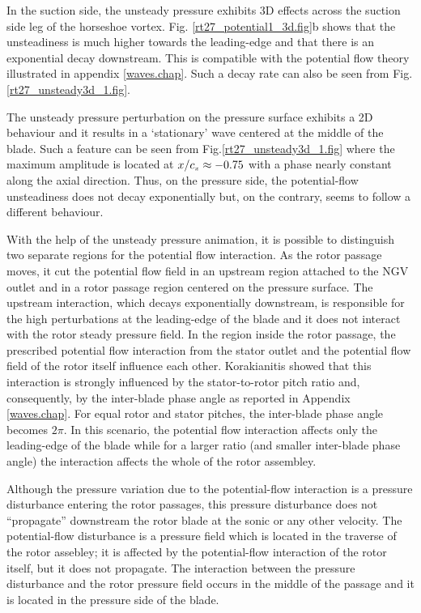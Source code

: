  In the suction side, the unsteady pressure exhibits 3D effects across the
 suction side leg of the horseshoe vortex.
 Fig. \ref{rt27_potential1_3d.fig}b shows that the
 unsteadiness is much higher towards the leading-edge and
 that there is an exponential decay downstream.
 This is compatible with the potential flow theory
 illustrated in appendix \ref{waves.chap}.
 Such a decay rate can also be seen from Fig. \ref{rt27_unsteady3d_1.fig}.

 The unsteady pressure perturbation on the pressure surface
 exhibits a 2D behaviour and it results
 in a `stationary' wave centered at the middle of the blade.
 Such a feature can be seen from Fig.\ref{rt27_unsteady3d_1.fig}
 where the maximum amplitude is located at $x/c_{\mbox{\tiny $x$}}\approx -0.75$
 with a phase nearly constant along the axial direction.
 Thus, on the pressure side, the potential-flow unsteadiness does not
 decay exponentially but, on the contrary, seems to follow a different
 behaviour.

 With the help of the unsteady pressure animation, it is possible to
 distinguish two separate regions for the potential flow interaction.
 As the rotor passage moves, it cut the potential flow field in an upstream
 region attached to the NGV outlet and in a rotor passage region
 centered on the pressure surface.
 The upstream interaction, which decays exponentially downstream,
 is responsible for the high perturbations at the leading-edge of
 the blade and it does not interact with the rotor steady pressure field.
 In the region inside the rotor passage, the prescribed potential flow
 interaction from the stator outlet and the potential flow field of the
 rotor itself influence each other.
 Korakianitis \citeyear{Kora:1,Kora:2,Kora:3} showed that this interaction
 is strongly influenced by the stator-to-rotor pitch
 ratio and, consequently, by the inter-blade phase angle as reported in
 Appendix \ref{waves.chap}.
 For equal rotor and stator pitches, the inter-blade phase angle
 becomes $2\pi$. In this scenario, the potential flow interaction affects
 only the leading-edge of the blade while for a larger ratio
 (and smaller inter-blade phase angle)
 the interaction affects the whole of the rotor assembley.

 Although the pressure variation due to the potential-flow interaction
 is a pressure disturbance entering the rotor passages, this pressure
 disturbance does not ``propagate'' downstream the rotor blade at the
 sonic or any other velocity. The potential-flow disturbance is a pressure
 field which is located in the traverse of the rotor assebley; it is affected
 by the potential-flow interaction of the rotor itself, but it does
 not propagate. The interaction between the pressure disturbance and
 the rotor pressure field occurs in the middle of the passage and it
 is located in the pressure side of the blade.

